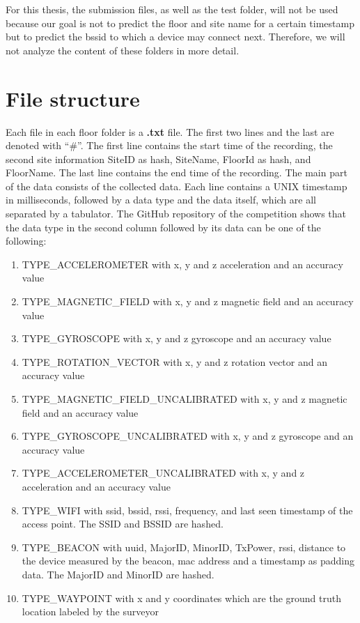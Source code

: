 For this thesis, the submission files, as well as the test folder, will not be used because our goal is not to predict the floor and site name for a certain timestamp but to predict the \ac{bssid} to which a device may connect next.
Therefore, we will not analyze the content of these folders in more detail.

\section{File structure}\label{sec:file-structure}

Each file in each floor folder is a \textbf{.txt} file. 
The first two lines and the last are denoted with ``\#''.
The first line contains the start time of the recording, the second site information SiteID as hash, SiteName, FloorId as hash, and FloorName.
The last line contains the end time of the recording.
The main part of the data consists of the collected data. 
Each line contains a UNIX timestamp in milliseconds, followed by a data type and the data itself, which are all separated by a tabulator.
The GitHub repository of the competition\cite{GitHubComp} shows that the data type in the second column followed by its data can be one of the following:

\begin{enumerate}
    \item\label{type:acce} TYPE\_ACCELEROMETER with x, y and z acceleration and an accuracy value
    \item\label{type:mag} TYPE\_MAGNETIC\_FIELD with x, y and z magnetic field and an accuracy value
    \item\label{type:gyro} TYPE\_GYROSCOPE with x, y and z gyroscope and an accuracy value
    \item\label{type:rot} TYPE\_ROTATION\_VECTOR with x, y and z rotation vector and an accuracy value
    \item\label{type:mag_u} TYPE\_MAGNETIC\_FIELD\_UNCALIBRATED with x, y and z magnetic field and an accuracy value
    \item\label{type:gyro_u} TYPE\_GYROSCOPE\_UNCALIBRATED with x, y and z gyroscope and an accuracy value
    \item\label{type:acce_u} TYPE\_ACCELEROMETER\_UNCALIBRATED with x, y and z acceleration and an accuracy value
    \item\label{type:wifi} TYPE\_WIFI with \ac{ssid}, \ac{bssid}, \ac{rssi}, frequency, and last seen timestamp of the access point. The SSID and BSSID are hashed.
    \item\label{type:beacon} TYPE\_BEACON with \ac{uuid}, \ac{MajorID}, \ac{MinorID}, \ac{TxPower}, \ac{rssi}, distance to the device measured by the beacon, \ac{mac} address and a timestamp as padding data. The MajorID and MinorID are hashed.
    \item\label{type:way} TYPE\_WAYPOINT with x and y coordinates which are the ground truth location labeled by the surveyor
\end{enumerate}

